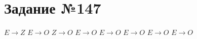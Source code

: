 \documentclass[12pt]{article}
\begin{document}
\section{Задание №147}
$E \rightarrow Z$
$E \rightarrow O$
$Z \rightarrow O$
$E \rightarrow O$
$E \rightarrow O$
$E \rightarrow O$
$E \rightarrow O$
$E \rightarrow O$
\end{document}
